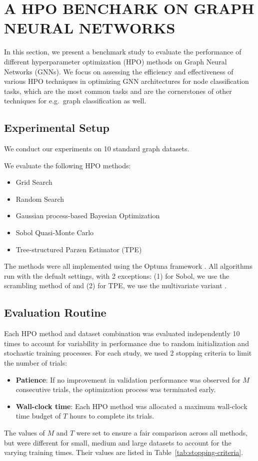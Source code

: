 \section{\uppercase{A HPO Benchark on Graph Neural Networks}}

In this section, we present a benchmark study to evaluate the performance of different hyperparameter optimization (HPO) methods on Graph Neural Networks (GNNs). We focus on assessing the efficiency and effectiveness of various HPO techniques in optimizing GNN architectures for node classification tasks, which are the most common tasks and are the cornerstones of other techniques for e.g.\ graph classification as well.

\subsection{Experimental Setup}
We conduct our experiments on 10 standard graph datasets.

We evaluate the following HPO methods:
\begin{itemize}
	\item Grid Search
	\item Random Search
	\item Gaussian process-based Bayesian Optimization \cite{rasmussen_gaussian_2003}
	\item Sobol Quasi-Monte Carlo \cite{sobol_distribution_1967, bergstra_random_2012}
	\item Tree-structured Parzen Estimator (TPE) \cite{bergstra_algorithms_2011}
\end{itemize}
The methods were all implemented using the Optuna framework \cite{akiba_optuna_2019}. All algorithms run with the defualt settings, with 2 exceptions: (1) for Sobol, we use the scrambling method of \cite{matousek_l2-discrepancy_1998} and (2) for TPE, we use the multivariate variant \cite{falkner_bohb_2018}.

\subsection{Evaluation Routine}
Each HPO method and dataset combination was evaluated independently 10 times to account for variability in performance due to random initialization and stochastic training processes. For each study, we used 2 stopping criteria to limit the number of trials:
\begin{itemize}
	\item \textbf{Patience}: If no improvement in validation performance was observed for \( M \) consecutive trials, the optimization process was terminated early.
	\item \textbf{Wall-clock time}: Each HPO method was allocated a maximum wall-clock time budget of \( T \) hours to complete its trials.
\end{itemize}
The values of \( M \) and \( T \) were set to ensure a fair comparison across all methods, but were different for small, medium and large datasets to account for the varying training times. Their values are listed in Table~\ref{tab:stopping-criteria}.

